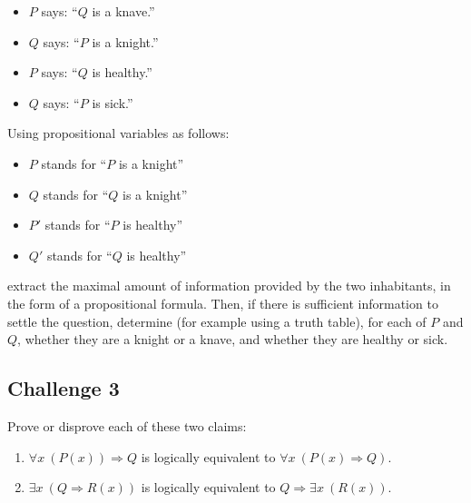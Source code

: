 \documentclass[12pt]{article}
\newcommand{\impl}{\mathbin{\Rightarrow}}
\begin{document}
\begin{minipage}{0.5\textwidth}
\begin{itemize}
\setlength{\itemsep}{-0.6ex}
\item
$P$ says: ``$Q$ is a knave.''
\item
$Q$ says: ``$P$ is a knight.''
\end{itemize}
\end{minipage}
\begin{minipage}{0.5\textwidth}
\begin{itemize}
\setlength{\itemsep}{-0.5ex}
\item
$P$ says: ``$Q$ is healthy.''
\item
$Q$ says: ``$P$ is sick.''
\end{itemize}
\end{minipage}
\medskip

\noindent
Using propositional variables as follows:
\begin{itemize}
\setlength{\itemsep}{-0.5ex}
\item
$P$ stands for ``$P$ is a knight''
\item
$Q$ stands for ``$Q$ is a knight''
\item
$P'$ stands for ``$P$ is healthy''
\item
$Q'$ stands for ``$Q$ is healthy''
\end{itemize}
extract the maximal amount of information provided by the two inhabitants,
in the form of a propositional formula.
Then, if there is sufficient information to settle the question,
determine (for example using a truth table), for each of $P$ and $Q$,
whether they are a knight or a knave, and whether they are healthy or sick.

\subsection*{Challenge 3}
Prove or disprove each of these two claims:
\begin{enumerate}
\setlength{\itemsep}{-0.5ex}
\item
$\forall x\ (P(x)) \impl Q$
is logically equivalent to
$\forall x\ (P(x) \impl Q)$.
\item
$\exists x\ (Q \impl R(x))$
is logically equivalent to
$Q \impl \exists x\ (R(x))$.
\end{enumerate}
\end{document}
